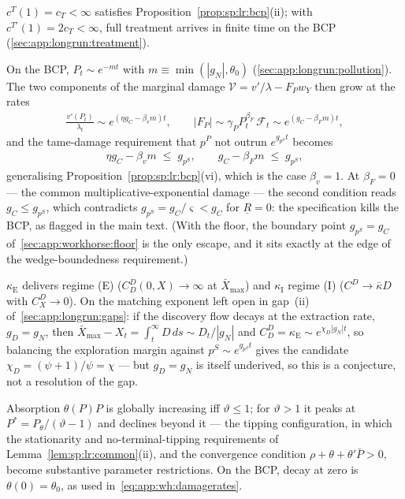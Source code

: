  $c^T\!\left(1\right)=c_T<\infty$ satisfies
Proposition~\ref{prop:sp:lr:bcp}(ii); with $c^{T\prime}\!\left(1\right)=2c_T<\infty$, full
treatment arrives in finite time on the BCP (\ref{sec:app:longrun:treatment}).

 On the BCP, $P_t\sim e^{-mt}$ with
$m\equiv\min\left(\left|g_N\right|,\theta_0\right)$
(\ref{sec:app:longrun:pollution}). The two components of the marginal damage
$\mathcal V=v'/\lambda-F_Pw_Y$ then grow at the rates
\begin{align}
\frac{v'\!\left(P_t\right)}{\lambda_t}\sim e^{\left(\eta g_C-\beta_vm\right)t},
\qquad
\left|F_P\right|\sim\gamma_PP_t^{\beta_F}\,\mathcal F_t\sim e^{\left(g_C-\beta_Fm\right)t},
\label{eq:app:wh:damagerates}
\end{align}
and the tame-damage requirement that $p^P$ not outrun $e^{g_{p^S}t}$ becomes
\begin{align}
\eta g_C-\beta_vm\;\le\;g_{p^S},
\qquad
g_C-\beta_Fm\;\le\;g_{p^S},
\label{eq:app:wh:damageconds}
\end{align}
generalising Proposition~\ref{prop:sp:lr:bcp}(vi), which is the case $\beta_v=1$. At
$\beta_F=0$ --- the common multiplicative-exponential damage --- the second condition reads
$g_C\le g_{p^S}$, which contradicts $g_{p^S}=g_C/\varsigma<g_C$ for $\underline R=0$: the
specification kills the BCP, as flagged in the main text. (With the floor, the boundary point
$g_{p^S}=g_C$ of~\ref{sec:app:workhorse:floor} is the only escape, and it sits exactly at the
edge of the wedge-boundedness requirement.)

 $\kappa_{\mathrm E}$ delivers regime (E)
($C^D_D\left(0,X\right)\to\infty$ at $\bar X_{\max}$) and $\kappa_{\mathrm I}$ regime (I)
($C^D\to\bar\kappa D$ with $C^D_X\to0$). On the matching exponent left open in
gap~(ii) of~\ref{sec:app:longrun:gaps}: if the discovery flow decays at the extraction rate,
$g_D=g_N$, then $\bar X_{\max}-X_t=\int_t^\infty D\,ds\sim D_t/\left|g_N\right|$ and
$C^D_D=\kappa_{\mathrm E}\sim e^{\chi_D\left|g_N\right|t}$, so balancing the exploration
margin against $p^S\sim e^{g_{p^S}t}$ gives the candidate
$\chi_D=\left(\psi+1\right)/\psi=\chi$ --- but $g_D=g_N$ is itself underived, so this is a
conjecture, not a resolution of the gap.

 Absorption $\theta\!\left(P\right)P$ is globally increasing iff
$\vartheta\le1$; for $\vartheta>1$ it peaks at $P^{*}=P_\theta/\left(\vartheta-1\right)$ and
declines beyond it --- the tipping configuration, in which the stationarity and
no-terminal-tipping requirements of Lemma~\ref{lem:sp:lr:common}(ii), and the convergence
condition $\rho+\theta+\theta'\bar P>0$, become substantive parameter restrictions. On the
BCP, decay at zero is $\theta\!\left(0\right)=\theta_0$, as used
in~\eqref{eq:app:wh:damagerates}.

